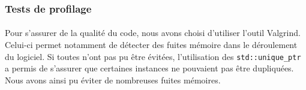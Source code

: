 \subsubsection{Tests de profilage}
\paragraph{}
Pour s'assurer de la qualité du code, nous avons choisi d'utiliser l'outil Valgrind. Celui-ci permet notamment de détecter des fuites mémoire dans le déroulement du logiciel. Si toutes n'ont pas pu être évitées, l'utilisation des \texttt{std::unique\_ptr} a permis de s'assurer que certaines instances ne pouvaient pas être dupliquées. Nous avons ainsi pu éviter de nombreuses fuites mémoires.
\clearpage

